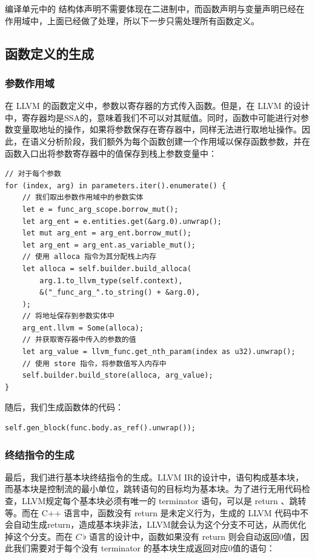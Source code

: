 \documentclass{ctexrep}
\newcommand{\cb}{$C\,\flat$\xspace}
\begin{document}
编译单元中的 结构体声明不需要体现在二进制中，而函数声明与变量声明已经在作用域中，上面已经做了处理，所以下一步只需处理所有函数定义。

\subsection{函数定义的生成}
\subsubsection{参数作用域}
在 LLVM 的函数定义中，参数以寄存器的方式传入函数。但是，在 LLVM 的设计中，寄存器均是SSA的，意味着我们不可以对其赋值。同时，函数中可能进行对参数变量取地址的操作，如果将参数保存在寄存器中，同样无法进行取地址操作。因此，在语义分析阶段，我们额外为每个函数创建一个作用域以保存函数参数，并在函数入口出将参数寄存器中的值保存到栈上参数变量中：
\begin{verbatim}
// 对于每个参数
for (index, arg) in parameters.iter().enumerate() {
    // 我们取出参数作用域中的参数实体
    let e = func_arg_scope.borrow_mut();
    let arg_ent = e.entities.get(&arg.0).unwrap();
    let mut arg_ent = arg_ent.borrow_mut();
    let arg_ent = arg_ent.as_variable_mut();
    // 使用 alloca 指令为其分配栈上内存
    let alloca = self.builder.build_alloca(
        arg.1.to_llvm_type(self.context),
        &("_func_arg_".to_string() + &arg.0),
    );
    // 将地址保存到参数实体中
    arg_ent.llvm = Some(alloca);
    // 并获取寄存器中传入的参数的值
    let arg_value = llvm_func.get_nth_param(index as u32).unwrap();
    // 使用 store 指令，将参数值写入内存中
    self.builder.build_store(alloca, arg_value);
}
\end{verbatim}
随后，我们生成函数体的代码：
\begin{verbatim}
self.gen_block(func.body.as_ref().unwrap());
\end{verbatim}

\subsubsection{终结指令的生成}

最后，我们进行基本块终结指令的生成。LLVM IR的设计中，语句构成基本块，而基本块是控制流的最小单位，跳转语句的目标均为基本块。为了进行无用代码检查，LLVM规定每个基本块必须有唯一的 terminator 语句，可以是 return 、跳转等。而在 C++ 语言中，函数没有 return 是未定义行为，生成的 LLVM 代码中不会自动生成return，造成基本块非法，LLVM就会认为这个分支不可达，从而优化掉这个分支。而在 \cb 语言的设计中，函数如果没有 return 则会自动返回0值，因此我们需要对于每个没有 terminator 的基本块生成返回对应0值的语句：
\end{document}
